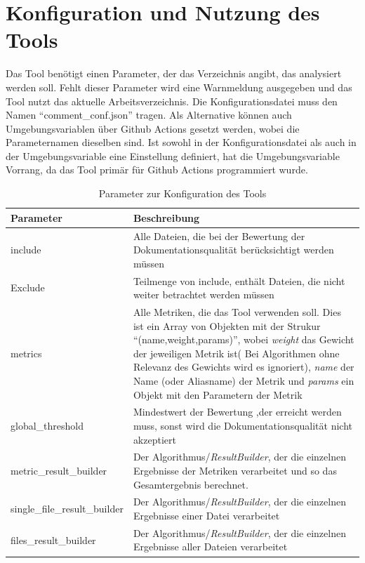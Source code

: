 \section{Konfiguration und Nutzung des Tools}
Das Tool benötigt einen Parameter, der das Verzeichnis angibt, das analysiert werden soll. Fehlt dieser Parameter wird eine Warnmeldung ausgegeben und das Tool nutzt das aktuelle Arbeitsverzeichnis. Die Konfigurationsdatei muss den Namen \enquote{comment\_conf.json} tragen. Als Alternative können auch Umgebungsvariablen über Github Actions gesetzt werden, wobei die Parameternamen dieselben sind. Ist sowohl in der Konfigurationsdatei als auch in der Umgebungsvariable eine Einstellung definiert, hat die Umgebungsvariable Vorrang, da das Tool primär für Github Actions programmiert wurde.
\begin{table}[h]
    \centering
    \begin{tabular}{m{4cm}|m{11cm}}
    \hline
        Parameter & Beschreibung  \\
        \hline
        include & Alle Dateien, die bei der Bewertung der Dokumentationsqualität berücksichtigt werden müssen\\
        \hline
        Exclude & Teilmenge von include, enthält Dateien, die nicht weiter betrachtet werden müssen\\
        \hline
        metrics & Alle Metriken, die das Tool verwenden soll. Dies ist ein Array von Objekten mit der Strukur \enquote{(name,weight,params)}, wobei \textit{weight} das Gewicht der jeweiligen Metrik ist( Bei Algorithmen ohne Relevanz des Gewichts wird es ignoriert), \textit{name} der Name (oder Aliasname) der Metrik und \textit{params} ein Objekt mit den Parametern der Metrik\\\hline
        global\_threshold & Mindestwert der Bewertung ,der erreicht werden muss, sonst wird die Dokumentationsqualität nicht akzeptiert\\\hline
        metric\_result\_builder & Der Algorithmus/\textit{ResultBuilder}, der die einzelnen Ergebnisse der Metriken verarbeitet und so das Gesamtergebnis berechnet.\\\hline
          single\_file\_result\_builder & Der Algorithmus/\textit{ResultBuilder}, der die einzelnen Ergebnisse einer Datei verarbeitet\\\hline
        files\_result\_builder & Der Algorithmus/\textit{ResultBuilder}, der die einzelnen Ergebnisse aller Dateien verarbeitet
        
    \end{tabular}
    \caption{Parameter zur Konfiguration des Tools}
    \label{tab:tool_javadoc_conf}
\end{table}

